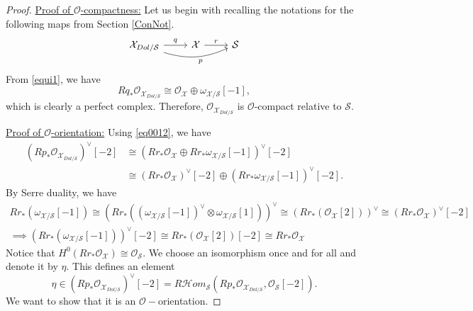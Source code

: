\documentclass[11pt]{amsart}
\theoremstyle{plain}
\numberwithin{equation}{section}
\theoremstyle{definition}
\theoremstyle{plain}
\begin{document}
\begin{proof} \textsf{\underline{Proof of $\mathcal O$-compactness:}} Let us begin with recalling the notations for the following maps from Section \ref{ConNot}. 
\begin{equation}
\begin{tikzcd}
\mathcal X_{Dol/\mathcal{S}}\arrow["q"]{r}\arrow[bend right=20,swap, "p"]{rr}  & \mathcal X \arrow["r"]{r} & \mathcal S
\end{tikzcd}
\end{equation}
From \eqref{equi1}, we have 
\begin{equation}\label{eq0012}
 Rq_*\mathcal O_{\mathcal X_{Dol/\mathcal{S}}}\cong \mathcal O_{\mathcal X}\oplus \omega_{\mathcal X/\mathcal S}[-1], 
\end{equation}
which is clearly a perfect complex. Therefore, $\mathcal O_{\mathcal X_{Dol/\mathcal{S}}}$ is $\mathcal O$-compact relative to $\mathcal{S}$.

\smallskip

\noindent
\textsf{\underline{Proof of $\mathcal O$-orientation:}} Using \eqref{eq0012}, we have
\begin{align*}
( Rp_*\mathcal O_{\mathcal X_{Dol/\mathcal{S}}})^{\vee}[-2] & \cong ( Rr_*\mathcal O_{\mathcal X}\oplus  Rr_*\omega_{\mathcal X/\mathcal S}[-1])^{\vee}[-2] \\ & \cong ( Rr_*\mathcal O_{\mathcal X})^{\vee}[-2]\oplus ( Rr_*\omega_{\mathcal X/\mathcal S}[-1])^{\vee}[-2].
\end{align*} 
By Serre duality, we have 
\begin{align*}
 Rr_*(\omega_{\mathcal X/\mathcal S}[-1])\cong ( Rr_*((\omega_{\mathcal X/\mathcal S}[-1])^{\vee}\otimes \omega_{\mathcal X/\mathcal S}[1]))^{\vee}\cong ( Rr_*(\mathcal O_{\mathcal X}[2]))^{\vee}\cong (Rr_*\mathcal O_{\mathcal X})^{\vee}[-2]\\
\implies ( Rr_*(\omega_{\mathcal X/\mathcal S}[-1]))^{\vee}[-2]\cong  Rr_*(\mathcal O_{\mathcal X}[2])[-2]\cong  Rr_*\mathcal O_{\mathcal X} \hspace{6em}
\end{align*} 
Notice that $H^0(Rr_*\mathcal O_{\mathcal X})\cong \mathcal O_{\mathcal S}$. We choose an isomorphism once and for all and denote it by $\eta$.
This defines an element 
\begin{equation}
\eta \in ( Rp_*\mathcal O_{\mathcal X_{Dol/\mathcal{S}}})^{\vee}[-2]=R\mathcal{H}om_{\mathcal{S}}(Rp_*\mathcal O_{\mathcal X_{Dol/\mathcal{S}}}, \mathcal O_{\mathcal S}[-2]).
\end{equation}
We want to show that it is an $\mathcal O-$orientation.


\end{proof}
\end{document}
